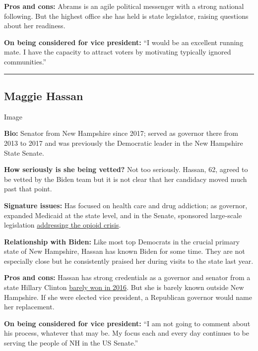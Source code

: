 \textbf{Pros and cons:} Abrams is an agile political messenger with a
strong national following. But the highest office she has held is state
legislator, raising questions about her readiness.

\textbf{On being considered for vice president:} ``I would be an
excellent running mate. I have the capacity to attract voters by
motivating typically ignored communities.''

\begin{center}\rule{0.5\linewidth}{\linethickness}\end{center}

\hypertarget{maggie-hassan}{%
\subsection{Maggie Hassan}\label{maggie-hassan}}

Image

\textbf{Bio:} Senator from New Hampshire since 2017; served as governor
there from 2013 to 2017 and was previously the Democratic leader in the
New Hampshire State Senate.

\textbf{How seriously is she being vetted?} Not too seriously. Hassan,
62, agreed to be vetted by the Biden team but it is not clear that her
candidacy moved much past that point.

\textbf{Signature issues:} Has focused on health care and drug
addiction; as governor, expanded Medicaid at the state level, and in the
Senate, sponsored large-scale legislation
\href{https://www.nytimes3xbfgragh.onion/2018/03/19/us/politics/trump-new-hampshire-opioid-plan.html}{addressing
the opioid crisis}.

\textbf{Relationship with Biden:} Like most top Democrats in the crucial
primary state of New Hampshire, Hassan has known Biden for some time.
They are not especially close but he consistently praised her during
visits to the state last year.

\textbf{Pros and cons:} Hassan has strong credentials as a governor and
senator from a state Hillary Clinton
\href{https://www.nytimes3xbfgragh.onion/2016/11/09/us/politics/new-hampshire-senate-hassan-ayotte.html}{barely
won in 2016}. But she is barely known outside New Hampshire. If she were
elected vice president, a Republican governor would name her
replacement.

\textbf{On being considered for vice president:} ``I am not going to
comment about his process, whatever that may be. My focus each and every
day continues to be serving the people of NH in the US Senate.''

